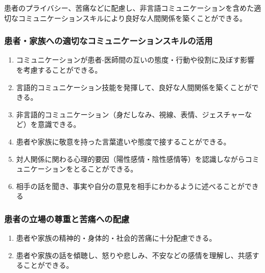 患者のプライバシー、苦痛などに配慮し、非言語コミュニケーションを含めた適切なコミュニケーションスキルにより良好な人間関係を築くことができる。

\hypertarget{ux60a3ux8005ux5bb6ux65cfux3078ux306eux9069ux5207ux306aux30b3ux30dfux30e5ux30cbux30b1ux30fcux30b7ux30e7ux30f3ux30b9ux30adux30ebux306eux6d3bux7528}{%
\subsubsection{患者・家族への適切なコミュニケーションスキルの活用}\label{ux60a3ux8005ux5bb6ux65cfux3078ux306eux9069ux5207ux306aux30b3ux30dfux30e5ux30cbux30b1ux30fcux30b7ux30e7ux30f3ux30b9ux30adux30ebux306eux6d3bux7528}}

\begin{enumerate}
\def\labelenumi{\arabic{enumi}.}
\tightlist
\item
  コミュニケーションが患者-医師間の互いの態度・行動や役割に及ぼす影響を考慮することができる。
\item
  言語的コミュニケーション技能を発揮して、良好な人間関係を築くことができる。
\item
  非言語的コミュニケーション（身だしなみ、視線、表情、ジェスチャーなど）を意識できる。
\item
  患者や家族に敬意を持った言葉遣いや態度で接することができる。
\item
  対人関係に関わる心理的要因（陽性感情・陰性感情等）を認識しながらコミュニケーションをとることができる。
\item
  相手の話を聞き、事実や自分の意見を相手にわかるように述べることができる
\end{enumerate}

\hypertarget{ux60a3ux8005ux306eux7acbux5834ux306eux5c0aux91cdux3068ux82e6ux75dbux3078ux306eux914dux616e}{%
\subsubsection{患者の立場の尊重と苦痛への配慮}\label{ux60a3ux8005ux306eux7acbux5834ux306eux5c0aux91cdux3068ux82e6ux75dbux3078ux306eux914dux616e}}

\begin{enumerate}
\def\labelenumi{\arabic{enumi}.}
\tightlist
\item
  患者や家族の精神的・身体的・社会的苦痛に十分配慮できる。
\item
  患者や家族の話を傾聴し、怒りや悲しみ、不安などの感情を理解し、共感することができる。
\end{enumerate}

